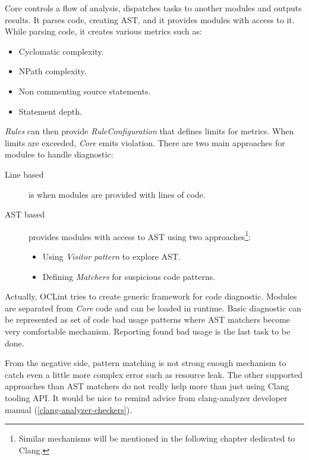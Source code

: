 Core controls a flow of analysis, dispatches tasks to another modules and outputs results. It parses code, creating AST, and it provides modules with access to it. While parsing code, it creates various metrics such as:

\begin{itemize}
\item Cyclomatic complexity.
\item NPath complexity.
\item Non commenting source statements.
\item Statement depth.
\end{itemize}

\emph{Rules} can then provide \emph{RuleConfiguration} that defines limits for metrics. When limits are exceeded, \emph{Core} emits violation. There are two main approaches for modules to handle diagnostic:

\begin{description}
\item[Line based] is when modules are provided with lines of code.
\item[AST based] provides modules with access to AST using two approaches\footnote{Similar mechanisms will be mentioned in the following chapter dedicated to Clang.}:
	\begin{itemize}
	\item Using \emph{Visitor pattern} to explore AST.
	\item Defining \emph{Matchers} for suspicious code patterns.
	\end{itemize}
\end{description}

Actually, OCLint tries to create generic framework for code diagnostic. Modules are separated from \emph{Core} code and can be loaded in runtime. Basic diagnostic can be represented as set of code bad usage patterns where AST matchers become very comfortable mechanism. Reporting found bad usage is the last task to be done.

From the negative side, pattern matching is not strong enough mechanism to catch even a little more complex error such as resource leak. The other supported approaches than AST matchers do not really help more than just using Clang tooling API. It would be nice to remind advice from clang-analyzer developer manual (\ref{clang-analyzer-checkers}).

